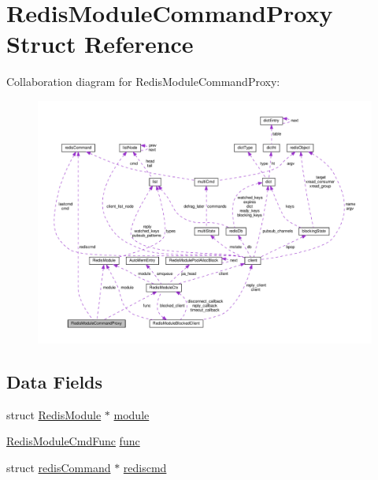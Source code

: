 \hypertarget{struct_redis_module_command_proxy}{}\section{Redis\+Module\+Command\+Proxy Struct Reference}
\label{struct_redis_module_command_proxy}


Collaboration diagram for Redis\+Module\+Command\+Proxy\+:
\nopagebreak
\begin{figure}[H]
\begin{center}
\leavevmode
\includegraphics[width=350pt]{struct_redis_module_command_proxy__coll__graph}
\end{center}
\end{figure}
\subsection*{Data Fields}
\begin{DoxyCompactItemize}
\item 
struct \hyperlink{struct_redis_module}{Redis\+Module} $\ast$ \hyperlink{struct_redis_module_command_proxy_a0b5d3833feb2320585734795fb7f62b6}{module}
\item 
\hyperlink{redismodule_8h_afd84062b24c2151cf8f2a53b955f9eed}{Redis\+Module\+Cmd\+Func} \hyperlink{struct_redis_module_command_proxy_a2e9ebffa1c494b2b6e53f3271290461c}{func}
\item 
struct \hyperlink{structredis_command}{redis\+Command} $\ast$ \hyperlink{struct_redis_module_command_proxy_a016430f13b3b7c484584bae32fe89fd5}{rediscmd}
\end{DoxyCompactItemize}


